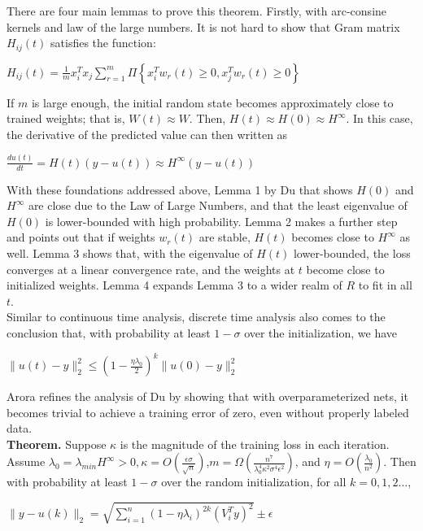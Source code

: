 \documentclass{article}
\begin{document}
There are four main lemmas to prove this theorem. Firstly, with arc-consine kernels and law of the large numbers. 
It is not hard to show that Gram matrix $H_{ij}(t)$ satisfies the function:
\begin{center}
    $H_{ij}(t) = \frac{1}{m} x_i^T x_j\sum_{r=1}^{m}\Pi\left\{ x_i^T w_r(t)\geq 0,x_j^T w_r(t)\geq 0\right\}$
\end{center}
If $m$ is large enough, the initial random state becomes approximately close to trained weights; that is, $W(t)\approx W$. Then, $H(t) \approx H(0) \approx H^{\infty}$. In this case, the derivative of the predicted value can then written as 
\begin{center}
    $\frac{d u(t)}{dt} = H(t)(y-u(t)) \approx H^{\infty}(y-u(t))$
\end{center}
With these foundations addressed above, Lemma 1 by Du that shows $H(0)$ and $H^{\infty}$ are close due to the Law of Large Numbers, and that the least eigenvalue of $H(0)$ is lower-bounded with high probability. Lemma 2 makes a further step and points out that if weights $w_r(t)$ are stable, $H(t)$ becomes close to $H^{\infty}$ as well. Lemma 3 shows that, with the eigenvalue of $H(t)$ lower-bounded, the loss converges at a linear convergence rate, and the weights at $t$ become close to initialized weights. Lemma 4 expands Lemma 3 to a wider realm of $R$ to fit in all $t$. \\ 

Similar to continuous time analysis, discrete time analysis also comes to the conclusion that, with probability at least $1-\sigma$ over the initialization, we have 
\begin{center}
    $\|u(t)-y\|^2_2 \leq (1-\frac{\eta \lambda_0}{2})^k\|u(0)-y\|^2_2$
\end{center}

Arora \cite{Arora} refines the analysis of Du \cite{SimonDu} by showing that with overparameterized nets, it becomes trivial to achieve a training error of zero, even without properly labeled data. \\

\textbf{Theorem.} Suppose $\kappa$ is the magnitude of the training loss in each iteration. Assume $\lambda_0 = \lambda_{min} H^{\infty} > 0, \kappa = O (\frac{\epsilon\sigma}{\sqrt{n}})$,$m = \Omega(\frac{n^7}{\lambda_0^4 \kappa^2\sigma^4\epsilon^2})$, and $\eta = O(\frac{\lambda_0}{n^2})$. Then with probability at least $1-\sigma$ over the random initialization, for all $k = 0,1,2 …$,
\begin{center}
    $\|y-u(k)\|_2 = \sqrt{\sum_{i=1}^n (1-\eta\lambda_i)^{2k} (V_i^T y)^2}\pm\epsilon$
\end{center}
\end{document}
